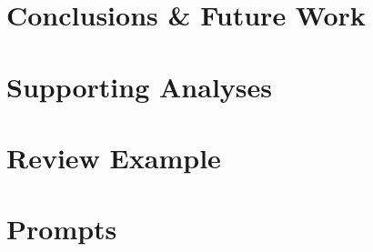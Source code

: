 \documentclass
[
    twoside,                 %
    openany,                 %
    cleardoublepage = empty, %
    fontsize = 12 pt,        %
    american,                %
    captions = tableheading, %
    numbers = noenddot,      %
    footheight = 35 pt,      %
]
{scrbook}
\begin{document}
    \chapter{Conclusions \& Future Work}\label{chap:conclusion}
    

    \pagestyle{plain}

    \renewcommand*{\bibfont}{\small}
    \printbibheading
    \printbibliography[heading = none]

    \appendix
    \chapter{Supporting Analyses}\label{app:supporting-analyses}
    

    \chapter{Review Example}\label{app:review-example-chapter}
    

    \chapter{Prompts}\label{chap:appendix-prompts}
    

    
\end{document}

